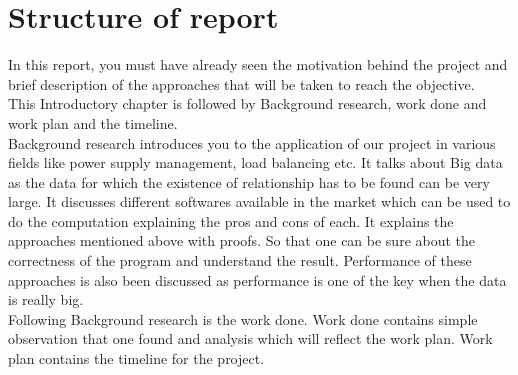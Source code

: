 \section{Structure of report}
In this report, you must have already seen the motivation behind the project and brief description of the approaches that will be taken to reach the objective.\\
This Introductory chapter is followed by Background research, work done and work plan and the timeline.\\
Background research introduces you to the application of our project in various fields like power supply management, load balancing etc. It talks about Big data as the data for which the existence of relationship has to be found can be very large. It discusses different softwares available in the market which can be used to do the computation explaining the pros and cons of each. It explains the approaches mentioned above with proofs. So that one can be sure about the correctness of the program and understand the result. Performance of these approaches is also been discussed as performance is one of the key when the data is really big.\\
Following Background research is the work done. Work done contains simple observation that one found and analysis which will reflect the work plan. Work plan contains the timeline for the project.